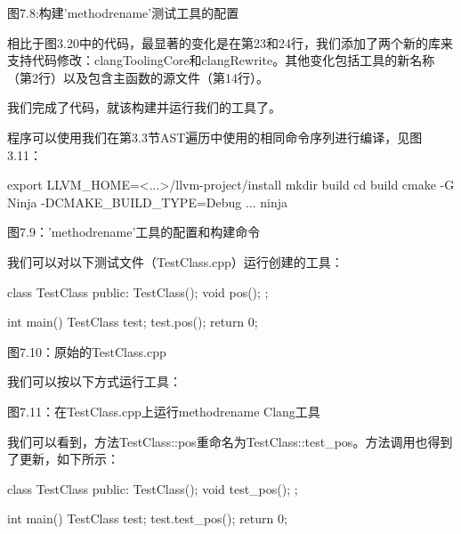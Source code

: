 \begin{center}
图7.8:构建'methodrename'测试工具的配置
\end{center}

相比于图3.20中的代码，最显著的变化是在第23和24行，我们添加了两个新的库来支持代码修改：clangToolingCore和clangRewrite。其他变化包括工具的新名称（第2行）以及包含主函数的源文件（第14行）。

我们完成了代码，就该构建并运行我们的工具了。


程序可以使用我们在第3.3节AST遍历中使用的相同命令序列进行编译，见图3.11：

\begin{shell}
export LLVM_HOME=<...>/llvm-project/install
mkdir build
cd build
cmake -G Ninja -DCMAKE_BUILD_TYPE=Debug ...
ninja
\end{shell}

\begin{center}
图7.9：'methodrename'工具的配置和构建命令
\end{center}

我们可以对以下测试文件（TestClass.cpp）运行创建的工具：

\begin{cpp}
class TestClass {
public:
  TestClass(){};
  void pos(){};
};

int main() {
  TestClass test;
  test.pos();
  return 0;
}
\end{cpp}


\begin{center}
图7.10：原始的TestClass.cpp
\end{center}

我们可以按以下方式运行工具：



\begin{center}
图7.11：在TestClass.cpp上运行methodrename Clang工具
\end{center}

我们可以看到，方法TestClass::pos重命名为TestClass::test\_pos。方法调用也得到了更新，如下所示：

\begin{cpp}
class TestClass {
public:
  TestClass(){};
  void test_pos(){};
};

int main() {
  TestClass test;
  test.test_pos();
  return 0;
}
\end{cpp}


